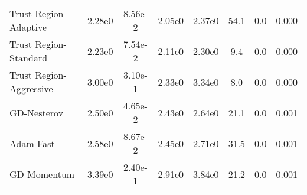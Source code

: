 \documentclass{article}
\begin{document}
\begin{table}[htbp]
{\begin{tabular}{p{2.5cm}*{7}{c}}
Trust Region-Adaptive & 2.28e0 & 8.56e-2 & 2.05e0 & 2.37e0 & 54.1 & 0.0 & 0.000 \\
Trust Region-Standard & 2.23e0 & 7.54e-2 & 2.11e0 & 2.30e0 & 9.4 & 0.0 & 0.000 \\
Trust Region-Aggressive & 3.00e0 & 3.10e-1 & 2.33e0 & 3.34e0 & 8.0 & 0.0 & 0.000 \\
GD-Nesterov & 2.50e0 & 4.65e-2 & 2.43e0 & 2.64e0 & 21.1 & 0.0 & 0.001 \\
Adam-Fast & 2.58e0 & 8.67e-2 & 2.45e0 & 2.71e0 & 31.5 & 0.0 & 0.001 \\
GD-Momentum & 3.39e0 & 2.40e-1 & 2.91e0 & 3.84e0 & 21.2 & 0.0 & 0.001 \\
\bottomrule
\end{tabular}
}
\end{table}
\end{document}
